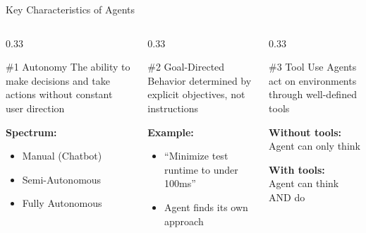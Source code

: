 \documentclass[aspectratio=169, 11pt]{beamer}
\begin{document}
\begin{frame}{Key Characteristics of Agents}
    \begin{columns}[T]
        \begin{column}{0.33\textwidth}
            \begin{block}{\#1 Autonomy}
                The ability to make decisions and take actions without constant user direction
                \vspace{0.3cm}

                \textbf{Spectrum:}
                \begin{itemize}
                    \item Manual (Chatbot)
                    \item Semi-Autonomous
                    \item Fully Autonomous
                \end{itemize}
            \end{block}
        \end{column}
        \begin{column}{0.33\textwidth}
            \begin{block}{\#2 Goal-Directed}
                Behavior determined by explicit objectives, not instructions
                \vspace{0.3cm}

                \textbf{Example:}
                \begin{itemize}
                    \item ``Minimize test runtime to under 100ms''
                    \item Agent finds its own approach
                \end{itemize}
            \end{block}
        \end{column}
        \begin{column}{0.33\textwidth}
            \begin{block}{\#3 Tool Use}
                Agents act on environments through well-defined tools
                \vspace{0.3cm}

                \textbf{Without tools:} \\
                Agent can only think

                \textbf{With tools:} \\
                Agent can think AND do
            \end{block}
        \end{column}
    \end{columns}

\end{frame}
\end{document}
